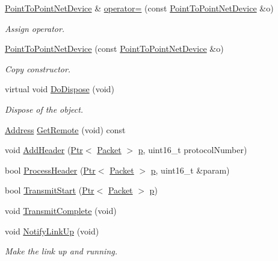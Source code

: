 \begin{DoxyCompactItemize}
\item 
\hyperlink{classns3_1_1PointToPointNetDevice}{Point\+To\+Point\+Net\+Device} \& \hyperlink{classns3_1_1PointToPointNetDevice_ae524d7b6eda23ec185a6af1b181c7551}{operator=} (const \hyperlink{classns3_1_1PointToPointNetDevice}{Point\+To\+Point\+Net\+Device} \&o)
\begin{DoxyCompactList}\small\item\em Assign operator. \end{DoxyCompactList}\item 
\hyperlink{classns3_1_1PointToPointNetDevice_a693fbf45f603ccbae39a0b17fe68a599}{Point\+To\+Point\+Net\+Device} (const \hyperlink{classns3_1_1PointToPointNetDevice}{Point\+To\+Point\+Net\+Device} \&o)
\begin{DoxyCompactList}\small\item\em Copy constructor. \end{DoxyCompactList}\item 
virtual void \hyperlink{classns3_1_1PointToPointNetDevice_a48af6554458c596f63bdb01613b01c2e}{Do\+Dispose} (void)
\begin{DoxyCompactList}\small\item\em Dispose of the object. \end{DoxyCompactList}\item 
\hyperlink{classns3_1_1Address}{Address} \hyperlink{classns3_1_1PointToPointNetDevice_acc5de3fd15ad3a0f24a05c7bc466d9a1}{Get\+Remote} (void) const 
\item 
void \hyperlink{classns3_1_1PointToPointNetDevice_a041de407f1f7fac39ba2c961f857fedb}{Add\+Header} (\hyperlink{classns3_1_1Ptr}{Ptr}$<$ \hyperlink{classns3_1_1Packet}{Packet} $>$ \hyperlink{lte__link__budget__x2__handover__measures_8m_ac9de518908a968428863f829398a4e62}{p}, uint16\+\_\+t protocol\+Number)
\item 
bool \hyperlink{classns3_1_1PointToPointNetDevice_ac2e48ae3ee00fcaff6f9e98984e5d3c6}{Process\+Header} (\hyperlink{classns3_1_1Ptr}{Ptr}$<$ \hyperlink{classns3_1_1Packet}{Packet} $>$ \hyperlink{lte__link__budget__x2__handover__measures_8m_ac9de518908a968428863f829398a4e62}{p}, uint16\+\_\+t \&param)
\item 
bool \hyperlink{classns3_1_1PointToPointNetDevice_a1ad9539543bb82303ce7ad8bcafe66e3}{Transmit\+Start} (\hyperlink{classns3_1_1Ptr}{Ptr}$<$ \hyperlink{classns3_1_1Packet}{Packet} $>$ \hyperlink{lte__link__budget__x2__handover__measures_8m_ac9de518908a968428863f829398a4e62}{p})
\item 
void \hyperlink{classns3_1_1PointToPointNetDevice_a86dc2c399ab676de4c0dfbd08366e7e2}{Transmit\+Complete} (void)
\item 
void \hyperlink{classns3_1_1PointToPointNetDevice_a3b7a16da1f47cdb6c702ed00b4dc2075}{Notify\+Link\+Up} (void)
\begin{DoxyCompactList}\small\item\em Make the link up and running. \end{DoxyCompactList}\end{DoxyCompactItemize}
